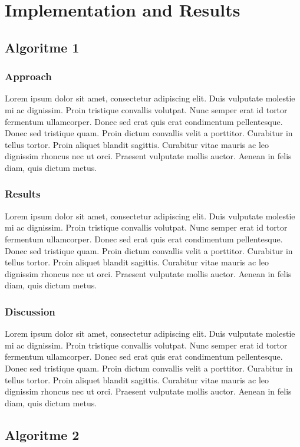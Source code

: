 \documentclass[11pt]{article}
\begin{document}
\section{Implementation and Results}
\subsection{Algoritme 1}
\subsubsection{Approach}
Lorem ipsum dolor sit amet, consectetur adipiscing elit. Duis vulputate molestie mi ac dignissim. Proin tristique convallis volutpat. Nunc semper erat id tortor fermentum ullamcorper. Donec sed erat quis erat condimentum pellentesque. Donec sed tristique quam. Proin dictum convallis velit a porttitor. Curabitur in tellus tortor. Proin aliquet blandit sagittis. Curabitur vitae mauris ac leo dignissim rhoncus nec ut orci. Praesent vulputate mollis auctor. Aenean in felis diam, quis dictum metus.

\subsubsection{Results}
Lorem ipsum dolor sit amet, consectetur adipiscing elit. Duis vulputate molestie mi ac dignissim. Proin tristique convallis volutpat. Nunc semper erat id tortor fermentum ullamcorper. Donec sed erat quis erat condimentum pellentesque. Donec sed tristique quam. Proin dictum convallis velit a porttitor. Curabitur in tellus tortor. Proin aliquet blandit sagittis. Curabitur vitae mauris ac leo dignissim rhoncus nec ut orci. Praesent vulputate mollis auctor. Aenean in felis diam, quis dictum metus.

\subsubsection{Discussion}
Lorem ipsum dolor sit amet, consectetur adipiscing elit. Duis vulputate molestie mi ac dignissim. Proin tristique convallis volutpat. Nunc semper erat id tortor fermentum ullamcorper. Donec sed erat quis erat condimentum pellentesque. Donec sed tristique quam. Proin dictum convallis velit a porttitor. Curabitur in tellus tortor. Proin aliquet blandit sagittis. Curabitur vitae mauris ac leo dignissim rhoncus nec ut orci. Praesent vulputate mollis auctor. Aenean in felis diam, quis dictum metus.

\subsection{Algoritme 2}
\end{document}
